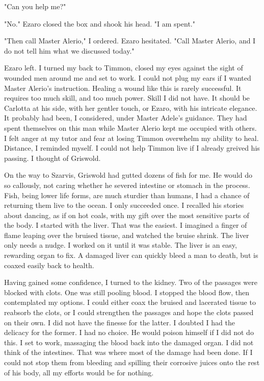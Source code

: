 \documentclass{article}
\begin{document}
"Can you help me?"

"No."  Ezaro closed the box and shook his head. "I am spent."

"Then call Master Alerio," I ordered. Ezaro hesitated. "Call Master Alerio, and I do not tell him what we discussed today."

Ezaro left. I turned my back to Timmon, closed my eyes against the sight of wounded men around me and set to work. I could not plug my ears if I wanted Master Alerio's instruction. Healing a wound like this is rarely successful. It requires too much skill, and too much power. Skill I did not have. It should be Carlotta at his side, with her gentler touch, or Ezaro, with his intricate elegance. It probably had been, I considered, under Master Adele's guidance. They had spent themselves on this man while Master Alerio kept me occupied with others. I felt anger at my tutor and fear at losing Timmon overwhelm my ability to heal. Distance, I reminded myself. I could not help Timmon live if I already greived his passing. I thought of Griswold. 

On the way to Szarvis, Griswold had gutted dozens of fish for me. He would do so callously, not caring whether he severed intestine or stomach in the process. Fish, being lower life forms, are much sturdier than humans, I had a chance of returning them live to the ocean. I only succeeded once. I recalled his stories about dancing, as if on hot coals, with my gift over the most sensitive parts of the body. I started with the liver. That was the easiest. I imagined a finger of flame leaping over the bruised tissue, and watched the bruise shrink. The liver only needs a nudge. I worked on it until it was stable. The liver is an easy, rewarding organ to fix. A damaged liver can quickly bleed a man to death, but is coaxed easily back to health. 

Having gained some confidence, I turned to the kidney. Two of the passages were blocked with clots. One was still pooling blood. I stopped the blood flow, then contemplated my options. I could either coax the bruised and lacerated tissue to reabsorb the clots, or I could strengthen the passages and hope the clots passed on their own. I did not have the finesse for the latter. I doubted I had the delicacy for the former. I had no choice. He would poison himself if I did not do this. I set to work, massaging the blood back into the damaged organ. I did not think of the intestines. That was where most of the damage had been done. If I could not stop them from bleeding and spilling their corrosive juices onto the rest of his body, all my efforts would be for nothing. 
\end{document}
